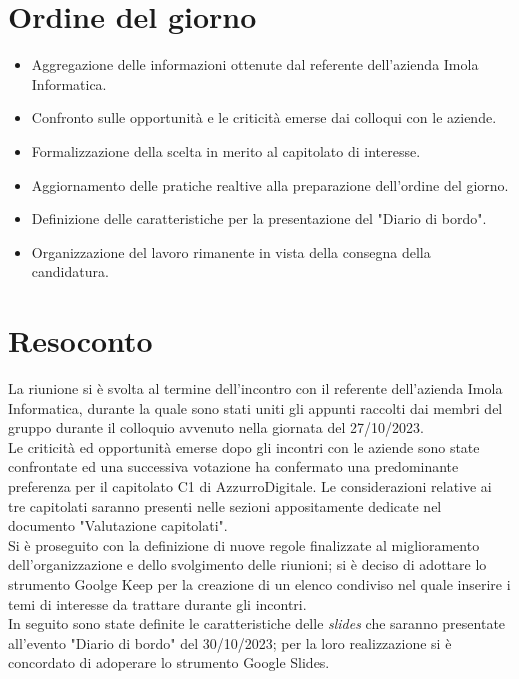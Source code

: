 \section{Ordine del giorno}
\begin{itemize}
    \item Aggregazione delle informazioni ottenute dal referente dell'azienda Imola Informatica.
    \item Confronto sulle opportunità e le criticità emerse dai colloqui con le aziende. 
	\item Formalizzazione della scelta in merito al capitolato di interesse.
	\item Aggiornamento delle pratiche realtive alla preparazione dell'ordine del giorno.
	\item Definizione delle caratteristiche per la presentazione del "Diario di bordo".
	\item Organizzazione del lavoro rimanente in vista della consegna della candidatura.
\end{itemize}

\section{Resoconto}
La riunione si è svolta al termine dell'incontro con il referente dell'azienda Imola Informatica, durante la quale sono stati uniti gli appunti raccolti dai membri del gruppo durante il colloquio avvenuto nella giornata del 27/10/2023.  \\

\noindent
Le criticità ed opportunità emerse dopo gli incontri con le aziende sono state confrontate ed una successiva votazione ha confermato una predominante preferenza per il capitolato C1 di AzzurroDigitale.
Le considerazioni relative ai tre capitolati saranno presenti nelle sezioni appositamente dedicate nel documento "Valutazione capitolati". \\

\noindent
Si è proseguito con la definizione di nuove regole finalizzate al miglioramento dell'organizzazione e dello svolgimento delle riunioni; si è deciso di adottare lo strumento Goolge Keep per la creazione di un elenco condiviso nel quale inserire i temi di interesse da trattare durante gli incontri. \\
In seguito sono state definite le caratteristiche delle \textit{slides} che saranno presentate all'evento "Diario di bordo" del 30/10/2023; per la loro realizzazione si è concordato di adoperare lo strumento Google Slides.

